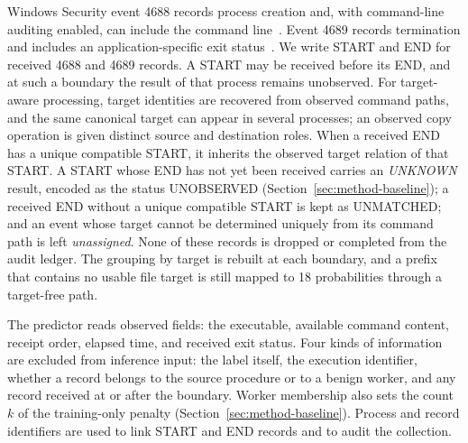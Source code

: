 Windows Security event 4688 records process creation and, with
command-line auditing enabled, can include the command
line~\cite{ms4688}. Event 4689 records termination and includes an
application-specific exit status~\cite{ms4689}.
We write START and END
for received 4688 and 4689 records. A START may be received before
its END, and at such a boundary the result of that process remains
unobserved. For target-aware processing, target identities are
recovered from observed command paths, and the same canonical target
can appear in several processes; an observed copy operation is given
distinct source and destination roles. When a received END has a unique
compatible START, it inherits the observed target relation of that
START. A START whose END has not yet been received carries an
\emph{UNKNOWN} result, encoded as the status UNOBSERVED
(Section~\ref{sec:method-baseline}); a received END without a unique
compatible START is kept as UNMATCHED; and an event whose target cannot
be determined uniquely from its command path is left \emph{unassigned}.
None of these records is dropped or completed from the audit ledger. The grouping by target is rebuilt at each boundary, and a prefix
that contains no usable file target is still mapped to 18 probabilities
through a target-free path.

The predictor reads observed fields: the executable, available command
content, receipt order, elapsed time, and received exit status. Four
kinds of information are excluded from inference input: the label itself, the execution identifier,
whether a record belongs to the source procedure or to a benign worker,
and any record received at or after the boundary. Worker membership
also sets the count $k$ of the training-only penalty
(Section~\ref{sec:method-baseline}). Process and record
identifiers are used to link START and END records and to audit the
collection.

